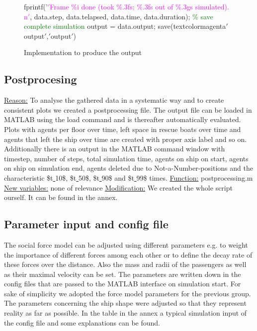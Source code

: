 \documentclass[11pt]{article}
\begin{document}
\begin{figure}[H]
\begin{tabular}
\newline
fprintf('\textcolor{magenta}{$'$Frame \%i done (took \%.3fs; \%.3fs out of \%.3gs simulated). n$'$}, 
\newline
data.step, data.telapsed, data.time, data.duration);
\newline
\newline
\textcolor{green}{\% save complete simulation}
\newline
output = data.output;
\newline
save(textcolor{magenta}{$'$output$'$,$'$output$'$})
\bigskip
\\ \hline
\end{tabular}
\caption{Implementation to produce the output}
\end{figure}

\subsection{Postprocesing}
\underline{Reason:}
\newline
To analyse the gathered data in a systematic way and to create consistent plots we created a postprocessing file. The output file can be loaded in MATLAB using the load command and is thereafter automatically evaluated. Plots with agents per floor over time, left space in rescue boats over time and agents that left the ship over time are created with proper axis label and so on. Additionally there is an output in the MATLAB command window with timestep, number of steps, total simulation time, agents on ship on start, agents on ship on simulation end, agents deleted due to Not-a-Number-positions and the characteristic \$t\underline{ }10\$, \$t\underline{ }50\$, \$t\underline{ }90\$ and \$t\underline{ }99\$ times.
\newline
\underline{Function:}
\newline
postprocessing.m
\newline
\underline{New variables:}
\newline
none of relevance
\newline
\underline{Modification:}
\newline
We created the whole script ourself. It can be found in the annex.
\subsection{Parameter input and config file}
The social force model can be adjusted using different parameters e.g. to weight the importance of different forces among each other or to define the decay rate of these forces over the distance. Also the mass and radii of the passengers as well as their maximal velocity can be set. The parameters are written down in the config files that are passed to the MATLAB interface on simulation start. For sake of simplicity we adopted the force model parameters for the previous group. The parameters concerning the ship shape were adjusted so that they represent reality as far as possible.
\newline
In the table in the annex a typical simulation input of the config file and some explanations can be found.
\end{document}
